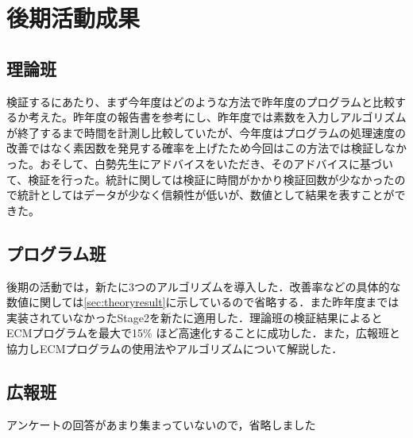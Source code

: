 \documentclass[openany,11pt,papersize]{jsbook}
\begin{document}
\chapter{後期活動成果}

\section{理論班}
検証するにあたり、まず今年度はどのような方法で昨年度のプログラムと比較するか考えた。昨年度の報告書を参考にし、昨年度では素数を入力しアルゴリズムが終了するまで時間を計測し比較していたが、今年度はプログラムの処理速度の改善ではなく素因数を発見する確率を上げたため今回はこの方法では検証しなかった。おそして、白勢先生にアドバイスをいただき、そのアドバイスに基づいて、検証を行った。統計に関しては検証に時間がかかり検証回数が少なかったので統計としてはデータが少なく信頼性が低いが、数値として結果を表すことができた。

\section{プログラム班}
後期の活動では，新たに3つのアルゴリズムを導入した．改善率などの具体的な数値に関しては\ref{sec:theoryresult}に示しているので省略する．また昨年度までは実装されていなかったStage2を新たに適用した．理論班の検証結果によるとECMプログラムを最大で15\% ほど高速化することに成功した．また，広報班と協力しECMプログラムの使用法やアルゴリズムについて解説した．

\section{広報班}
アンケートの回答があまり集まっていないので，省略しました
\end{document}

